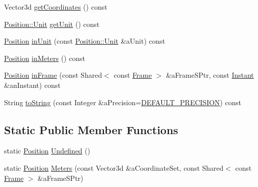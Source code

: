 \begin{DoxyCompactItemize}
\item 
Vector3d \hyperlink{classostk_1_1physics_1_1coord_1_1_position_ad316c42a469eb41062d15338d3ee7262}{get\+Coordinates} () const
\item 
\hyperlink{classostk_1_1physics_1_1units_1_1_length_a2664470a7eedf5d45c88861fe69badea}{Position\+::\+Unit} \hyperlink{classostk_1_1physics_1_1coord_1_1_position_aa62c2a532593e1e0e7f6ae180b2190f1}{get\+Unit} () const
\item 
\hyperlink{classostk_1_1physics_1_1coord_1_1_position}{Position} \hyperlink{classostk_1_1physics_1_1coord_1_1_position_a91baafa3dbbd48de681204c1c437ea35}{in\+Unit} (const \hyperlink{classostk_1_1physics_1_1units_1_1_length_a2664470a7eedf5d45c88861fe69badea}{Position\+::\+Unit} \&a\+Unit) const
\item 
\hyperlink{classostk_1_1physics_1_1coord_1_1_position}{Position} \hyperlink{classostk_1_1physics_1_1coord_1_1_position_a4df0c4df2717f7f6613e18a0d8e177e4}{in\+Meters} () const
\item 
\hyperlink{classostk_1_1physics_1_1coord_1_1_position}{Position} \hyperlink{classostk_1_1physics_1_1coord_1_1_position_a01c22174b6c2d27ccb363f35e307c5e9}{in\+Frame} (const Shared$<$ const \hyperlink{classostk_1_1physics_1_1coord_1_1_frame}{Frame} $>$ \&a\+Frame\+S\+Ptr, const \hyperlink{classostk_1_1physics_1_1time_1_1_instant}{Instant} \&an\+Instant) const
\item 
String \hyperlink{classostk_1_1physics_1_1coord_1_1_position_a4b5e999fb0fd55eda5637efa9694852e}{to\+String} (const Integer \&a\+Precision=\hyperlink{_velocity_8hpp_a6d81881a7883657dbc659ca545d9085d}{D\+E\+F\+A\+U\+L\+T\+\_\+\+P\+R\+E\+C\+I\+S\+I\+ON}) const
\end{DoxyCompactItemize}
\subsection*{Static Public Member Functions}
\begin{DoxyCompactItemize}
\item 
static \hyperlink{classostk_1_1physics_1_1coord_1_1_position}{Position} \hyperlink{classostk_1_1physics_1_1coord_1_1_position_a9d9c2e5b2a72f978192eb9e3a7ce7d8b}{Undefined} ()
\item 
static \hyperlink{classostk_1_1physics_1_1coord_1_1_position}{Position} \hyperlink{classostk_1_1physics_1_1coord_1_1_position_abb788f397f0db9c86f7af8213ca2b063}{Meters} (const Vector3d \&a\+Coordinate\+Set, const Shared$<$ const \hyperlink{classostk_1_1physics_1_1coord_1_1_frame}{Frame} $>$ \&a\+Frame\+S\+Ptr)
\end{DoxyCompactItemize}
